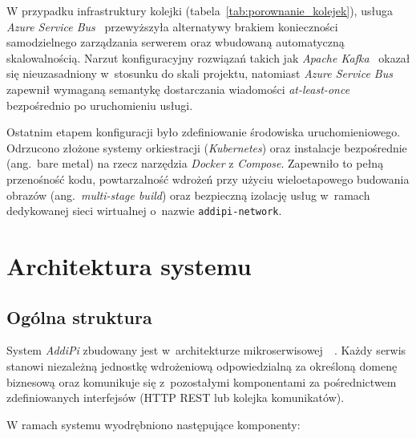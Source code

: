 \documentclass[a4paper,12pt,reqno]{article}
\begin{document}
W przypadku infrastruktury kolejki (tabela~\ref{tab:porownanie_kolejek}), usługa \textit{Azure Service Bus}~\cite{servicebus} przewyższyła alternatywy brakiem konieczności samodzielnego zarządzania serwerem oraz wbudowaną automatyczną skalowalnością. Narzut konfiguracyjny rozwiązań takich jak \textit{Apache Kafka}~\cite{apache_kafka} okazał się nieuzasadniony w~stosunku do skali projektu, natomiast \textit{Azure Service Bus} zapewnił wymaganą semantykę dostarczania wiadomości \textit{at-least-once} bezpośrednio po uruchomieniu usługi.

Ostatnim etapem konfiguracji było zdefiniowanie środowiska uruchomieniowego. Odrzucono złożone systemy orkiestracji (\textit{Kubernetes}) oraz instalacje bezpośrednie (ang.~bare metal) na rzecz narzędzia \textit{Docker} z \textit{Compose}. Zapewniło to pełną przenośność kodu, powtarzalność wdrożeń przy użyciu wieloetapowego budowania obrazów (ang.~\textit{multi-stage build}) oraz bezpieczną izolację usług w~ramach dedykowanej sieci wirtualnej o~nazwie \texttt{addipi-\allowbreak{}network}.
\newpage
\section{Architektura systemu}
\label{sec:architektura}

\subsection{Ogólna struktura}

System \textit{AddiPi} zbudowany jest w~architekturze mikroserwisowej~\cite{richardson2020}~\cite{newman2022}. Każdy serwis stanowi niezależną jednostkę wdrożeniową odpowiedzialną za określoną domenę biznesową oraz komunikuje się z~pozostałymi komponentami za pośrednictwem zdefiniowanych interfejsów (HTTP REST lub kolejka komunikatów).

W ramach systemu wyodrębniono następujące komponenty:
\end{document}
